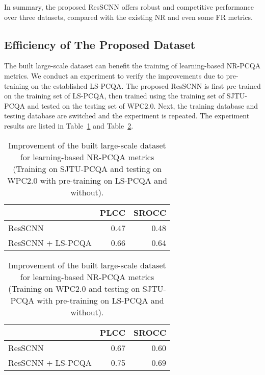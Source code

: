 \documentclass[acmsmall]{acmart}
\begin{document}
\par In summary, the proposed ResSCNN offers robust and competitive performance over three datasets, compared with the existing NR and even some FR metrics.

\subsection{Efﬁciency of The Proposed Dataset}

\par The built large-scale dataset can benefit the training of learning-based NR-PCQA metrics. We conduct an experiment to verify the improvements due to pre-training on the established LS-PCQA. The proposed ResSCNN is first pre-trained on the training set of LS-PCQA, then trained using the training set of SJTU-PCQA and tested on the testing set of WPC2.0. Next, the training database and testing database are switched and the experiment is repeated. The experiment results are listed in Table~\ref{cross1} and Table~\ref{cross2}.

\begin{table}[h]
  \centering
  \caption{Improvement of the built large-scale dataset for learning-based NR-PCQA metrics (Training on SJTU-PCQA and testing on WPC2.0 with pre-training on LS-PCQA and without).}
  \begin{footnotesize}
    \begin{tabular}{l|rr}
    \hline
          & \multicolumn{1}{l}{PLCC} & \multicolumn{1}{l}{SROCC} \\
    \hline
    ResSCNN & 0.47   & 0.48 \\
    \hline
    ResSCNN + LS-PCQA & 0.66   & 0.64 \\
    \hline
    \end{tabular}\end{footnotesize}
  \label{cross1}\end{table}

\begin{table}[h]
  \centering
  \caption{Improvement of the built large-scale dataset for learning-based NR-PCQA metrics (Training on WPC2.0 and testing on SJTU-PCQA with pre-training on LS-PCQA and without).}
  \begin{footnotesize}
    \begin{tabular}{l|rr}
    \hline
          & \multicolumn{1}{l}{PLCC} & \multicolumn{1}{l}{SROCC} \\
    \hline
    ResSCNN & 0.67   & 0.60 \\
    \hline
    ResSCNN + LS-PCQA & 0.75   & 0.69 \\
    \hline
    \end{tabular}\end{footnotesize}
  \label{cross2}\end{table}
\end{document}
